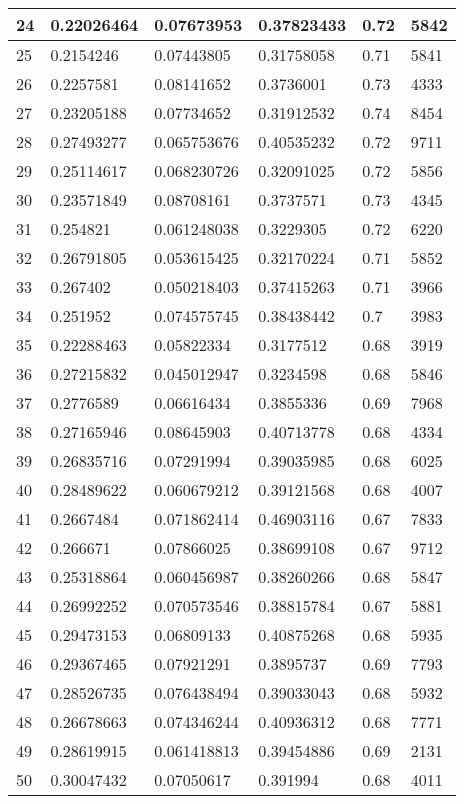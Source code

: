\begin{longtable}{|l|l|l|l|l|l|}
24 & 0.22026464 & 0.07673953 & 0.37823433 & 0.72 & 5842 \\ \hline 
25 & 0.2154246 & 0.07443805 & 0.31758058 & 0.71 & 5841 \\ \hline 
26 & 0.2257581 & 0.08141652 & 0.3736001 & 0.73 & 4333 \\ \hline 
27 & 0.23205188 & 0.07734652 & 0.31912532 & 0.74 & 8454 \\ \hline 
28 & 0.27493277 & 0.065753676 & 0.40535232 & 0.72 & 9711 \\ \hline 
29 & 0.25114617 & 0.068230726 & 0.32091025 & 0.72 & 5856 \\ \hline 
30 & 0.23571849 & 0.08708161 & 0.3737571 & 0.73 & 4345 \\ \hline 
31 & 0.254821 & 0.061248038 & 0.3229305 & 0.72 & 6220 \\ \hline 
32 & 0.26791805 & 0.053615425 & 0.32170224 & 0.71 & 5852 \\ \hline 
33 & 0.267402 & 0.050218403 & 0.37415263 & 0.71 & 3966 \\ \hline 
34 & 0.251952 & 0.074575745 & 0.38438442 & 0.7 & 3983 \\ \hline 
35 & 0.22288463 & 0.05822334 & 0.3177512 & 0.68 & 3919 \\ \hline 
36 & 0.27215832 & 0.045012947 & 0.3234598 & 0.68 & 5846 \\ \hline 
37 & 0.2776589 & 0.06616434 & 0.3855336 & 0.69 & 7968 \\ \hline 
38 & 0.27165946 & 0.08645903 & 0.40713778 & 0.68 & 4334 \\ \hline 
39 & 0.26835716 & 0.07291994 & 0.39035985 & 0.68 & 6025 \\ \hline 
40 & 0.28489622 & 0.060679212 & 0.39121568 & 0.68 & 4007 \\ \hline 
41 & 0.2667484 & 0.071862414 & 0.46903116 & 0.67 & 7833 \\ \hline 
42 & 0.266671 & 0.07866025 & 0.38699108 & 0.67 & 9712 \\ \hline 
43 & 0.25318864 & 0.060456987 & 0.38260266 & 0.68 & 5847 \\ \hline 
44 & 0.26992252 & 0.070573546 & 0.38815784 & 0.67 & 5881 \\ \hline 
45 & 0.29473153 & 0.06809133 & 0.40875268 & 0.68 & 5935 \\ \hline 
46 & 0.29367465 & 0.07921291 & 0.3895737 & 0.69 & 7793 \\ \hline 
47 & 0.28526735 & 0.076438494 & 0.39033043 & 0.68 & 5932 \\ \hline 
48 & 0.26678663 & 0.074346244 & 0.40936312 & 0.68 & 7771 \\ \hline 
49 & 0.28619915 & 0.061418813 & 0.39454886 & 0.69 & 2131 \\ \hline 
50 & 0.30047432 & 0.07050617 & 0.391994 & 0.68 & 4011 \\ \hline 
\end{longtable}
